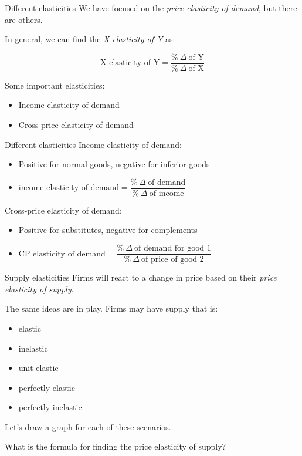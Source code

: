 \documentclass[aspectratio=169]{beamer}
\begin{document}
 \begin{frame}{Different elasticities}
    We have focused on the \textit{price elasticity of demand}, but there are others.

    \medskip

    In general, we can find the \textit{X elasticity of Y} as:

    $$
    \text{X elasticity of Y} = \dfrac{\%~\Delta~\text{of Y}}{\%~\Delta~\text{of X}}
    $$

    Some important elasticities:
    \begin{itemize}
        \item Income elasticity of demand
        \item Cross-price elasticity of demand
    \end{itemize}
 \end{frame}

 \begin{frame}{Different elasticities}
    Income elasticity of demand:
    \begin{itemize}
        \item Positive for normal goods, negative for inferior goods
        \item $\text{income elasticity of demand} = \dfrac{\%~\Delta~\text{of demand}}{\%~\Delta~\text{of income}}$
    \end{itemize}

    \medskip

    Cross-price elasticity of demand:
    \begin{itemize}
        \item Positive for substitutes, negative for complements
        \item $\text{CP elasticity of demand} = \dfrac{\%~\Delta~\text{of demand for good 1}}{\%~\Delta~\text{of price of good 2}}$
    \end{itemize}
 \end{frame}

 \begin{frame}{Supply elasticities}
    Firms will react to a change in price based on their \textit{price elasticity of supply}.

    \vspace{5mm}

    The same ideas are in play. Firms may have supply that is:
    \begin{itemize}
        \item elastic
        \item inelastic
        \item unit elastic
        \item perfectly elastic
        \item perfectly inelastic
    \end{itemize}

    Let's draw a graph for each of these scenarios.

    \medskip

    What is the formula for finding the price elasticity of supply?
 \end{frame}
\end{document}
